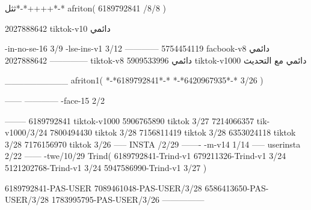 ثثل*-*++++*-*
afriton(
6189792841 /8/8
)

2027888642 tiktok-v10
دائمي

-in-no-se-16 3/9
-lse-ins-v1 3/12
------------
5754454119 facbook-v8
دائمي
--------------
2027888642 tiktok-v8
دائمي
5909533996 tiktok-v1000
دائمي مع التحديث

__________
afriton1(
*-*6189792841*-*
*-*6420967935*-* 3/26
)


------
------------
-face-15 2/2

--------
6189792841 tiktok-v1000
5906765890 tiktok 3/27
7214066357 tik-v1000/3/24
7800494430 tiktok 3/28
7156811419 tiktok 3/28
6353024118 tiktok 3/28
7176156970 tiktok 3/26
-----
 INSTA /2/29
-------
-m-v14 1/14
-----
userinsta 2/22
------
-twe/10/29
Trind(
6189792841-Trind-v1 
679211326-Trind-v1 3/24
5121202768-Trind-v1 3/24
5947586990-Trind-v1 3/27
)

6189792841-PAS-USER
7089461048-PAS-USER/3/28
6586413650-PAS-USER/3/28
1783995795-PAS-USER/3/26
    ---------------
